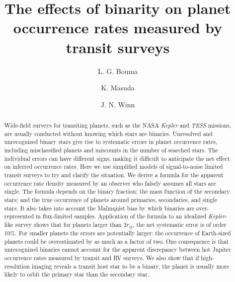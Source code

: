 \documentclass[12pt,modern]{aastex61}
\begin{document}
    
\title{ The effects of binarity on planet occurrence rates measured by
transit surveys}
%
%
\author{L. G. Bouma}
\author{K. Masuda}
\author{J. N. Winn}
%
%
\begin{abstract}
%

Wide-field surveys for transiting planets, such as the NASA
{\it Kepler} and {\it TESS} missions, are usually conducted without
knowing which stars are binaries. Unresolved and unrecognized binary
stars give rise to systematic errors in planet occurrence rates,
including misclassified planets and miscounts in the number of
searched stars. The individual errors can have different signs,
making it difficult to anticipate the net effect on inferred
occurrence rates. Here we use simplified models of signal-to-noise
limited transit surveys to try and clarify the situation. We derive
a formula for the apparent occurrence rate density measured by an
observer who falsely assumes all stars are single. The formula
depends on the binary fraction; the mass function of the secondary
stars; and the true occurrence of planets around primaries,
secondaries, and single stars. It also takes into account the
Malmquist bias by which binaries are over-represented in
flux-limited samples. Application of the formula to an idealized
{\it Kepler}-like survey shows that for planets larger than
$2r_\oplus$, the net systematic error is of order 10\%. For smaller
planets the errors are potentially larger: the occurrence of
Earth-sized planets could be overestimated by as much as a factor of
two. One consequence is that unrecognized binaries cannot account
for the apparent discrepancy between hot Jupiter occurrence
rates measured by transit and RV surveys. We also show that if
high-resolution imaging reveals a transit host star to be a binary,
the planet is usually more likely to orbit the primary star than the
secondary star.
%
\end{abstract}
%
%
%

%
\end{document}
